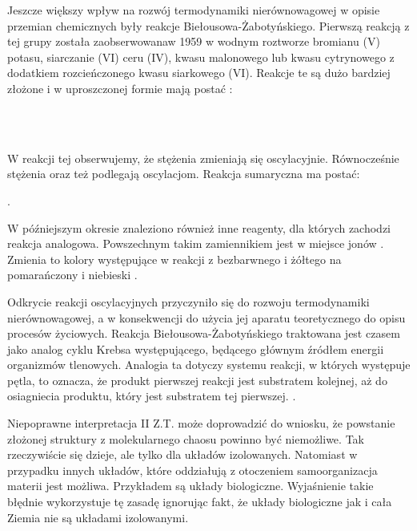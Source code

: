 \documentclass[10pt, a4paper, twoside, onecolumn]{article}
\numberwithin{equation}{section}
\begin{document}
	Jeszcze większy wpływ na rozwój termodynamiki nierównowagowej w opisie przemian chemicznych były reakcje Biełousowa-Żabotyńskiego. Pierwszą reakcją z tej grupy została zaobserwowanaw 1959 w wodnym roztworze bromianu (V) potasu, siarczanie (VI) ceru (IV), kwasu malonowego lub kwasu cytrynowego z dodatkiem rozcieńczonego kwasu siarkowego (VI). Reakcje te są dużo bardziej złożone i w uproszczonej formie mają postać \cite{orlik}:
	\begin{center}
		 \\
		 \\
	\end{center}
	W reakcji tej obserwujemy, że stężenia  zmieniają się oscylacyjnie. Równocześnie stężenia  oraz  też podlegają oscylacjom. Reakcja sumaryczna ma postać: 
	\begin{center}
		.
	\end{center}
	W późniejszym okresie znaleziono również inne reagenty, dla których zachodzi reakcja analogowa. Powszechnym takim zamiennikiem jest  w miejsce jonów . Zmienia to kolory występujące w reakcji z bezbarwnego i żółtego na pomarańczony i niebieski \cite{orlik}. \par
	Odkrycie reakcji oscylacyjnych przyczyniło się do rozwoju termodynamiki nierównowagowej, a w konsekwencji do użycia jej aparatu teoretycznego do opisu procesów życiowych. 
	Reakcja Biełousowa-Żabotyńskiego traktowana jest czasem jako analog cyklu Krebsa występującego, będącego głównym źródłem energii organizmów tlenowych. Analogia ta dotyczy systemu reakcji, w których występuje pętla, to oznacza, że produkt pierwszej reakcji jest substratem kolejnej, aż do osiagniecia produktu, który jest substratem tej pierwszej. \cite{belousov_hist}. \par
	Niepoprawne interpretacja II Z.T. może doprowadzić do wniosku, że powstanie złożonej struktury z molekularnego chaosu powinno być niemożliwe. Tak rzeczywiście się dzieje, ale tylko dla układów izolowanych. Natomiast w przypadku innych układów, które oddziałują z otoczeniem samoorganizacja materii jest możliwa. Przykładem są układy biologiczne. Wyjaśnienie takie błędnie wykorzystuje tę zasadę ignorując fakt, że układy biologiczne jak i cała Ziemia nie są układami izolowanymi. 
	
\end{document}
